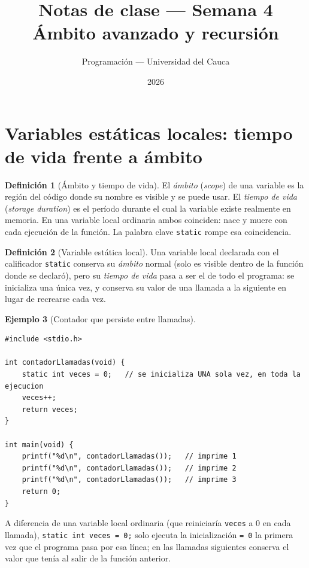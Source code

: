 \documentclass[11pt,letterpaper]{article}
\title{\textcolor{unicaucaverde}{\Large Notas de clase --- Semana 4}\\[4pt]
  \large Ámbito avanzado y recursión}
\author{Programación --- Universidad del Cauca}
\date{2026}
\theoremstyle{definition}
\newtheorem{definicion}{Definición}[section]
\newtheorem{ejemplo}[definicion]{Ejemplo}
\begin{document}
\maketitle
\tableofcontents

\section{Variables estáticas locales: tiempo de vida frente a ámbito}

\begin{definicion}[Ámbito y tiempo de vida]
El \emph{ámbito} (\emph{scope}) de una variable es la región del código donde su nombre es visible
y se puede usar. El \emph{tiempo de vida} (\emph{storage duration}) es el período durante el cual
la variable existe realmente en memoria. En una variable local ordinaria ambos coinciden: nace y
muere con cada ejecución de la función. La palabra clave \texttt{static} rompe esa coincidencia.
\end{definicion}

\begin{definicion}[Variable estática local]
Una variable local declarada con el calificador \texttt{static} conserva su \emph{ámbito} normal
(solo es visible dentro de la función donde se declaró), pero su \emph{tiempo de vida} pasa a ser
el de todo el programa: se inicializa una única vez, y conserva su valor de una llamada a la
siguiente en lugar de recrearse cada vez.
\end{definicion}

\begin{ejemplo}[Contador que persiste entre llamadas]
\begin{lstlisting}
#include <stdio.h>

int contadorLlamadas(void) {
    static int veces = 0;   // se inicializa UNA sola vez, en toda la ejecucion
    veces++;
    return veces;
}

int main(void) {
    printf("%d\n", contadorLlamadas());   // imprime 1
    printf("%d\n", contadorLlamadas());   // imprime 2
    printf("%d\n", contadorLlamadas());   // imprime 3
    return 0;
}
\end{lstlisting}
A diferencia de una variable local ordinaria (que reiniciaría \texttt{veces} a 0 en cada llamada),
\texttt{static int veces = 0;} solo ejecuta la inicialización \texttt{= 0} la primera vez que el
programa pasa por esa línea; en las llamadas siguientes conserva el valor que tenía al salir de la
función anterior.
\end{ejemplo}
\end{document}
